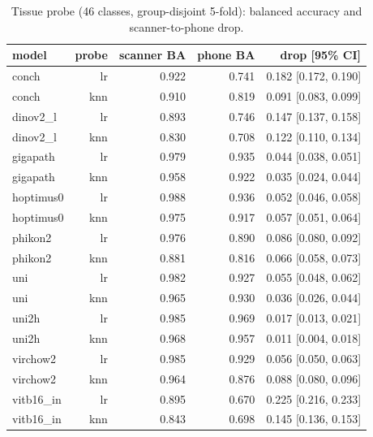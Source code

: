 \begin{table}[t]
\centering
\small
\begin{tabular}{lrrrr}
\toprule
model & probe & scanner BA & phone BA & drop [95\% CI] \\
\midrule
conch & lr & 0.922 & 0.741 & 0.182 [0.172, 0.190] \\
conch & knn & 0.910 & 0.819 & 0.091 [0.083, 0.099] \\
dinov2\_l & lr & 0.893 & 0.746 & 0.147 [0.137, 0.158] \\
dinov2\_l & knn & 0.830 & 0.708 & 0.122 [0.110, 0.134] \\
gigapath & lr & 0.979 & 0.935 & 0.044 [0.038, 0.051] \\
gigapath & knn & 0.958 & 0.922 & 0.035 [0.024, 0.044] \\
hoptimus0 & lr & 0.988 & 0.936 & 0.052 [0.046, 0.058] \\
hoptimus0 & knn & 0.975 & 0.917 & 0.057 [0.051, 0.064] \\
phikon2 & lr & 0.976 & 0.890 & 0.086 [0.080, 0.092] \\
phikon2 & knn & 0.881 & 0.816 & 0.066 [0.058, 0.073] \\
uni & lr & 0.982 & 0.927 & 0.055 [0.048, 0.062] \\
uni & knn & 0.965 & 0.930 & 0.036 [0.026, 0.044] \\
uni2h & lr & 0.985 & 0.969 & 0.017 [0.013, 0.021] \\
uni2h & knn & 0.968 & 0.957 & 0.011 [0.004, 0.018] \\
virchow2 & lr & 0.985 & 0.929 & 0.056 [0.050, 0.063] \\
virchow2 & knn & 0.964 & 0.876 & 0.088 [0.080, 0.096] \\
vitb16\_in & lr & 0.895 & 0.670 & 0.225 [0.216, 0.233] \\
vitb16\_in & knn & 0.843 & 0.698 & 0.145 [0.136, 0.153] \\
\bottomrule
\end{tabular}
\caption{Tissue probe (46 classes, group-disjoint 5-fold): balanced accuracy and scanner-to-phone drop.}
\label{tab:probe}
\end{table}
